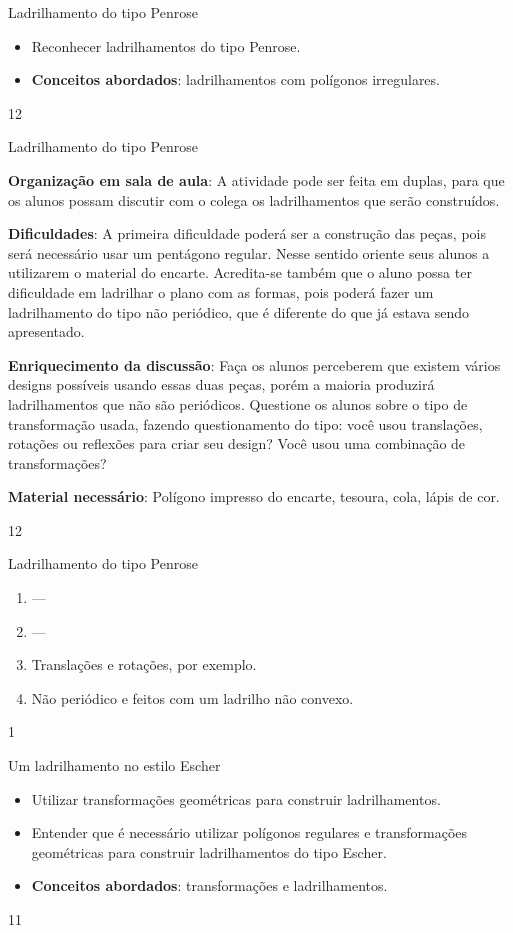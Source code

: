 \begin{objectives}{Ladrilhamento do tipo Penrose}
{
	\begin{itemize}
	\item Reconhecer ladrilhamentos do tipo Penrose.
	\item \textbf{Conceitos abordados}: ladrilhamentos com polígonos irregulares.
	\end{itemize}
}{1}{2}
\end{objectives}
\begin{sugestions}{Ladrilhamento do tipo Penrose}
{
	\textbf{Organização em sala de aula}: A atividade pode ser feita em duplas, para que os alunos possam discutir com o colega os ladrilhamentos que serão construídos.

	\textbf{Dificuldades}: A primeira dificuldade poderá ser a construção das peças, pois será necessário usar um pentágono regular. Nesse sentido oriente seus alunos a utilizarem o material do encarte. Acredita-se também que o aluno possa ter dificuldade em ladrilhar o plano com as formas, pois poderá fazer um ladrilhamento do tipo não periódico, que é diferente do que já estava sendo apresentado. 

	\textbf{Enriquecimento da discussão}: Faça os alunos perceberem  que existem vários designs possíveis usando essas duas peças, porém a maioria produzirá ladrilhamentos que não são periódicos. Questione os alunos sobre o tipo de transformação usada, fazendo questionamento do tipo: você usou translações, rotações ou reflexões para criar seu design? Você usou uma combinação de transformações? 

	\textbf{Material necessário}: Polígono impresso do encarte, tesoura, cola, lápis de cor.
}{1}{2}
\end{sugestions}
\begin{answer}{Ladrilhamento do tipo Penrose}
{
	\begin{enumerate}
	\item ---
	\item ---
	\item Translações e rotações, por exemplo.
	\item Não periódico e feitos com um ladrilho não convexo.
	\end{enumerate}
}{1}
\end{answer}
\clearmargin
\begin{objectives}{Um ladrilhamento no estilo Escher}
{
	\begin{itemize}
	\item Utilizar transformações geométricas para construir ladrilhamentos.
	\item Entender que é necessário utilizar polígonos regulares e transformações geométricas para construir ladrilhamentos do tipo Escher.
	\item \textbf{Conceitos abordados}: transformações e ladrilhamentos.
	\end{itemize}
}{1}{1}
\end{objectives}
